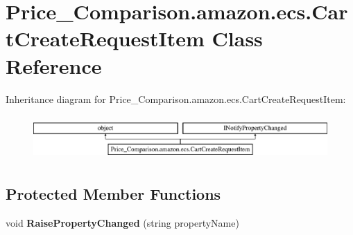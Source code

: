 \hypertarget{class_price___comparison_1_1amazon_1_1ecs_1_1_cart_create_request_item}{\section{Price\-\_\-\-Comparison.\-amazon.\-ecs.\-Cart\-Create\-Request\-Item Class Reference}
\label{class_price___comparison_1_1amazon_1_1ecs_1_1_cart_create_request_item}
}


 


Inheritance diagram for Price\-\_\-\-Comparison.\-amazon.\-ecs.\-Cart\-Create\-Request\-Item\-:\begin{figure}[H]
\begin{center}
\leavevmode
\includegraphics[height=1.712538cm]{class_price___comparison_1_1amazon_1_1ecs_1_1_cart_create_request_item}
\end{center}
\end{figure}
\subsection*{Protected Member Functions}
\begin{DoxyCompactItemize}
\item 
\hypertarget{class_price___comparison_1_1amazon_1_1ecs_1_1_cart_create_request_item_a87955604e95ba104a06aa73a2bc51bf7}{void {\bfseries Raise\-Property\-Changed} (string property\-Name)}\label{class_price___comparison_1_1amazon_1_1ecs_1_1_cart_create_request_item_a87955604e95ba104a06aa73a2bc51bf7}

\end{DoxyCompactItemize}

